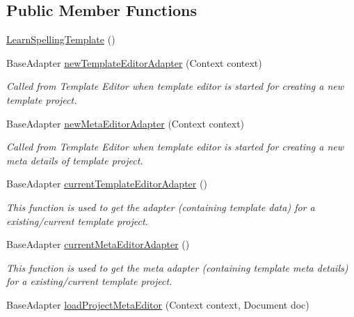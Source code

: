 \subsection*{Public Member Functions}
\begin{DoxyCompactItemize}
\item 
\hyperlink{classorg_1_1buildmlearn_1_1toolkit_1_1templates_1_1LearnSpellingTemplate_a09607c7a192a1e5754bfe51d3cac5df9}{Learn\+Spelling\+Template} ()
\item 
Base\+Adapter \hyperlink{classorg_1_1buildmlearn_1_1toolkit_1_1templates_1_1LearnSpellingTemplate_a532c1020ba161742148024ce7346d306}{new\+Template\+Editor\+Adapter} (Context context)
\begin{DoxyCompactList}\small\item\em Called from Template Editor when template editor is started for creating a new template project. \end{DoxyCompactList}\item 
Base\+Adapter \hyperlink{classorg_1_1buildmlearn_1_1toolkit_1_1templates_1_1LearnSpellingTemplate_ad0d219aa413e781c88283c06bc607214}{new\+Meta\+Editor\+Adapter} (Context context)
\begin{DoxyCompactList}\small\item\em Called from Template Editor when template editor is started for creating a new meta details of template project. \end{DoxyCompactList}\item 
Base\+Adapter \hyperlink{classorg_1_1buildmlearn_1_1toolkit_1_1templates_1_1LearnSpellingTemplate_a46ba1da1d9832f8e2ffbaf5a416a23f8}{current\+Template\+Editor\+Adapter} ()
\begin{DoxyCompactList}\small\item\em This function is used to get the adapter (containing template data) for a existing/current template project. \end{DoxyCompactList}\item 
Base\+Adapter \hyperlink{classorg_1_1buildmlearn_1_1toolkit_1_1templates_1_1LearnSpellingTemplate_a5d4732acb45a266bca9bc14deb0ea5a1}{current\+Meta\+Editor\+Adapter} ()
\begin{DoxyCompactList}\small\item\em This function is used to get the meta adapter (containing template meta details) for a existing/current template project. \end{DoxyCompactList}\item 
Base\+Adapter \hyperlink{classorg_1_1buildmlearn_1_1toolkit_1_1templates_1_1LearnSpellingTemplate_ab8d89b8b5575e3a9227664bc4f03ebed}{load\+Project\+Meta\+Editor} (Context context, Document doc)

\end{DoxyCompactItemize}
